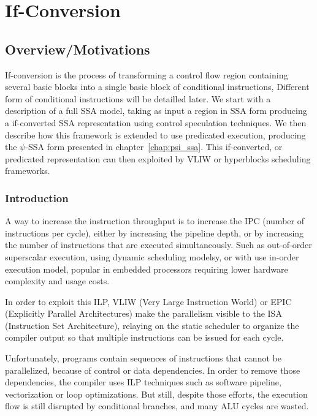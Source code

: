 \chapter{If-Conversion }\label{chap:if_conversion}
\label{chap:if_conv}
\graphicspath{{img/}{if_conversion/img/}{part4/if_conversion/img/}}

\newcommand\cond{~?~}
\newcommand{\annotation}[1]{%
  \marginpar{\small\itshape\color{red}#1}}


\section{Overview/Motivations}

If-conversion is the process of transforming a control flow region containing several basic blocks into a single basic block of conditional instructions, Different form of conditional instructions will be detailled later. 
We start with a description of a full SSA model, taking as input a region in SSA form producing a if-converted SSA representation using control speculation techniques.
We then describe how this framework is extended to use predicated execution, producing the $\psi$-SSA form presented in chapter~\ref{chap:psi_ssa}.
This if-converted, or predicated representation can then exploited by VLIW or hyperblocks scheduling frameworks.

\subsection{Introduction}

A way to increase the instruction throughput is to increase the IPC (number of instructions per cycle), either by increasing the pipeline depth, or by increasing the number of instructions that are executed simultaneously. Such as out-of-order superscalar execution, using dynamic scheduling modelsy, or with use in-order execution model, popular in embedded processors requiring lower hardware complexity and usage costs. 

In order to exploit this ILP, VLIW (Very Large Instruction World) or EPIC (Explicitly Parallel Architectures) make the parallelism visible to the ISA (Instruction Set Architecture), relaying on the static scheduler to organize the compiler output so that multiple instructions can be issued for each cycle. 

Unfortunately, programs contain sequences of instructions that cannot be parallelized, because of control or data dependencies. In order to remove those dependencies, the compiler uses ILP techniques such as software pipeline, vectorization or loop optimizations. But still, despite those efforts, the execution flow is still disrupted by conditional branches, and many ALU cycles are wasted. 

